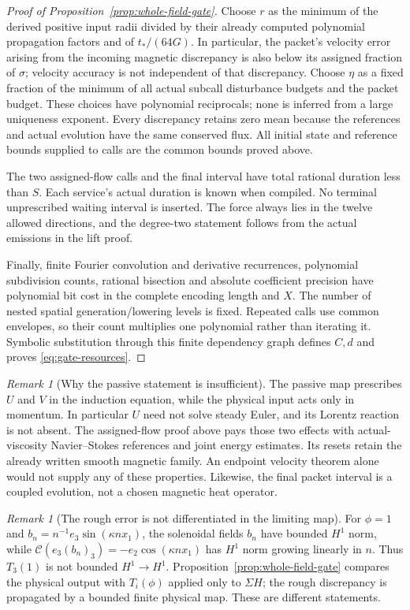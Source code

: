 \documentclass[11pt,a4paper]{amsart}
\theoremstyle{definition}
\theoremstyle{remark}
\newtheorem{remark}[theorem]{Remark}
\numberwithin{equation}{section}
\begin{document}
\begin{proof}[Proof of Proposition~\ref{prop:whole-field-gate}]
Choose $r$ as the minimum of the derived positive input radii divided by
their already computed polynomial propagation factors and of
$t_*/(64G)$.  In particular, the packet's velocity error arising from the
incoming magnetic discrepancy is also below its assigned fraction of
$\sigma$; velocity accuracy is not independent of that discrepancy.
Choose $\eta$ as a fixed fraction of the minimum of all actual
subcall disturbance budgets and the packet budget.  These choices have
polynomial reciprocals; none is inferred from a large uniqueness exponent.
Every discrepancy retains zero mean because the references and actual
evolution have the same conserved flux.  All initial state and reference
bounds supplied to calls are the common bounds proved above.

The two assigned-flow calls and the final interval have total rational
duration less than $S$.  Each service's actual duration is known when
compiled.  No terminal unprescribed waiting interval is inserted.  The
force always lies in the twelve allowed directions, and the degree-two
statement follows from the actual emissions in the lift proof.

Finally, finite Fourier convolution and derivative recurrences, polynomial
subdivision counts, rational bisection and absolute coefficient precision
have polynomial bit cost in the complete encoding length and $X$.  The
number of nested spatial generation/lowering levels is fixed.  Repeated
calls use common envelopes, so their count multiplies one polynomial
rather than iterating it.  Symbolic substitution through this finite
dependency graph defines $C,d$ and proves \eqref{eq:gate-resources}.
\end{proof}

\begin{remark}[Why the passive statement is insufficient]
The passive map prescribes $U$ and $V$ in the induction equation, while the
physical input acts only in momentum.  In particular $U$ need not solve
steady Euler, and its Lorentz reaction is not absent.  The assigned-flow
proof above pays those two effects with actual-viscosity Navier--Stokes
references and joint energy estimates.  Its resets retain the already
written smooth magnetic family.  An endpoint velocity theorem alone would
not supply any of these properties.  Likewise, the final packet interval
is a coupled evolution, not a chosen magnetic heat operator.
\end{remark}

\begin{remark}[The rough error is not differentiated in the limiting map]
For $\phi=1$ and $b_n=n^{-1}e_3\sin(\kappa n x_1)$, the solenoidal fields
$b_n$ have bounded $H^1$ norm, while
$\mathscr C(e_3(b_n)_3)=-e_2\cos(\kappa n x_1)$ has $H^1$ norm growing
linearly in $n$.  Thus $T_3(1)$ is not bounded $H^1\to H^1$.
Proposition~\ref{prop:whole-field-gate} compares the physical output with
$T_i(\phi)$ applied only to $\Sigma H$; the rough discrepancy is propagated
by a bounded finite physical map.  These are different statements.
\end{remark}
\end{document}
